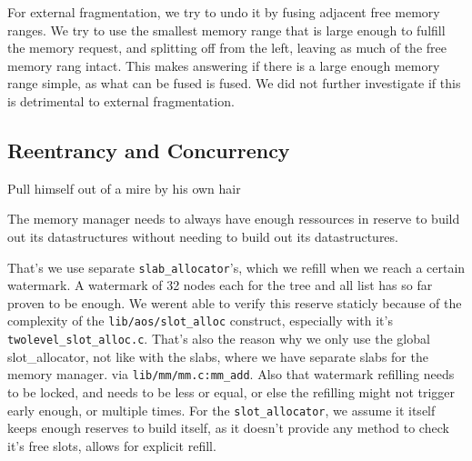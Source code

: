 For external fragmentation, we try to undo it by fusing adjacent free memory
ranges.
We try to use the smallest memory range that is large enough to fulfill the
memory request, and splitting off from the left, leaving as much of the free
memory rang intact.
This makes answering if there is a large enough memory range simple, as what
can be fused is fused.
We did not further investigate if this is detrimental to external fragmentation.

% 
% 
% 

\subsection{Reentrancy and Concurrency}\label{mem-con}

\begin{displayquote}
Pull himself out of a mire by his own hair
\end{displayquote}

The memory manager needs to always have enough ressources in reserve to build out
its datastructures without needing to build out its datastructures.

That's we use separate \verb|slab_allocator|'s, which we refill when we reach a
certain watermark.
A watermark of 32 nodes each for the tree and all list has so far proven to be
enough.
We werent able to verify this reserve staticly because of the complexity of the
\verb|lib/aos/slot_alloc| construct, especially with it's
\verb|twolevel_slot_alloc.c|.
That's also the reason why we only use the global slot\_allocator, not like with
the slabs, where we have separate slabs for the memory manager.
via \verb|lib/mm/mm.c:mm_add|.
Also that watermark refilling needs to be locked, and needs to be less or equal,
or else the refilling might not trigger early enough, or multiple times.
For the \verb|slot_allocator|, we assume it itself keeps enough reserves to build
itself, as it doesn't provide any method to check it's free slots, allows for
explicit refill.

